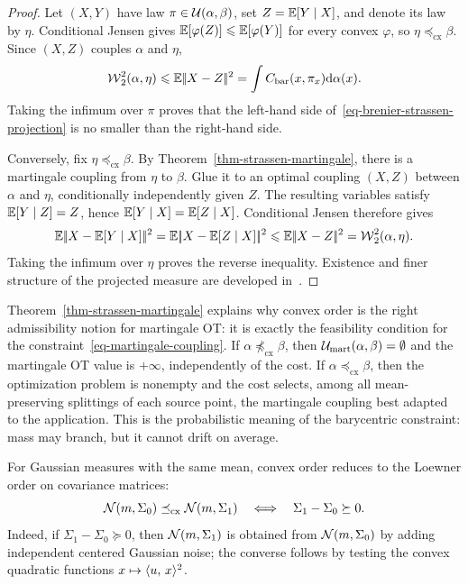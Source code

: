 \begin{proof}
	Let $(X,Y)$ have law $\pi\in\mathcal{U}(\alpha,\beta)$, set $Z=\mathbb{E}[Y\mid X]$, and denote its law by $\eta$. Conditional Jensen gives
	\(\mathbb{E}[\varphi(Z)] \leqslant \mathbb{E}[\varphi(Y)]\)
	for every convex $\varphi$, so $\eta\preceq_{\mathrm{cx}}\beta$. Since $(X,Z)$ couples $\alpha$ and $\eta$,
	\[
		\operatorname{\mathcal{W}}_2^2(\alpha,\eta)
		\leqslant
		\mathbb{E}|\!| X-Z |\!|^2
		=
		\int C_{\mathrm{bar}}(x,\pi_x)\mathrm{d}\alpha(x).
	\]
	Taking the infimum over $\pi$ proves that the left-hand side of~\eqref{eq-brenier-strassen-projection} is no smaller than the right-hand side.

	Conversely, fix $\eta\preceq_{\mathrm{cx}}\beta$. By Theorem~\ref{thm-strassen-martingale}, there is a martingale coupling from $\eta$ to $\beta$. Glue it to an optimal coupling $(X,Z)$ between $\alpha$ and $\eta$, conditionally independently given $Z$. The resulting variables satisfy $\mathbb{E}[Y\mid Z]=Z$, hence
	\(\mathbb{E}[Y\mid X]=\mathbb{E}[Z\mid X]\).
	Conditional Jensen therefore gives
	\[
		\mathbb{E}|\!| X-\mathbb{E}[Y\mid X] |\!|^2
		=
		\mathbb{E}|\!| X-\mathbb{E}[Z\mid X] |\!|^2
		\leqslant
		\mathbb{E}|\!| X-Z |\!|^2
		=
		\operatorname{\mathcal{W}}_2^2(\alpha,\eta).
	\]
	Taking the infimum over $\eta$ proves the reverse inequality. Existence and finer structure of the projected measure are developed in~\cite{backhoff2019weak}.
\end{proof}

Theorem~\ref{thm-strassen-martingale} explains why convex order is the right admissibility notion for martingale OT: it is exactly the feasibility condition for the constraint~\eqref{eq-martingale-coupling}. If $\alpha\not\preceq_{\mathrm{cx}}\beta$, then $\mathcal{U}_{\mathrm{mart}}(\alpha,\beta)=\emptyset$ and the martingale OT value is $+\infty$, independently of the cost. If $\alpha\preceq_{\mathrm{cx}}\beta$, then the optimization problem is nonempty and the cost selects, among all mean-preserving splittings of each source point, the martingale coupling best adapted to the application. This is the probabilistic meaning of the barycentric constraint: mass may branch, but it cannot drift on average.

For Gaussian measures with the same mean, convex order reduces to the Loewner order on covariance matrices:
\[
	\mathcal{N}(m,\Sigma_0)\preceq_{\mathrm{cx}}\mathcal{N}(m,\Sigma_1)
	\quad\Longleftrightarrow\quad
	\Sigma_1-\Sigma_0\succeq0.
\]
Indeed, if $\Sigma_1-\Sigma_0\succeq0$, then $\mathcal{N}(m,\Sigma_1)$ is obtained from $\mathcal{N}(m,\Sigma_0)$ by adding independent centered Gaussian noise; the converse follows by testing the convex quadratic functions $x\mapsto\langle u,\,x\rangle^2$.

